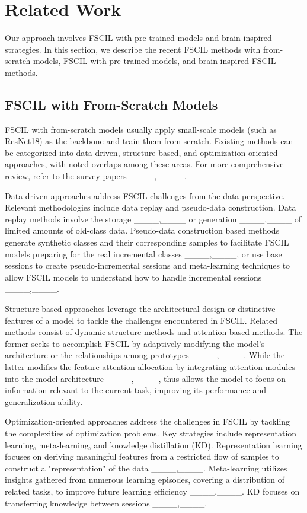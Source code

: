 \section{Related Work}
\label{sec:relatedwork}
Our approach involves FSCIL with pre-trained models and brain-inspired strategies. In this section, we describe the recent FSCIL methods with from-scratch models, FSCIL with pre-trained models, and brain-inspired FSCIL methods.
\subsection{FSCIL with From-Scratch Models}
FSCIL with from-scratch models usually apply small-scale models (such as ResNet18) as the backbone and train them from scratch. Existing methods can be categorized into data-driven, structure-based, and optimization-oriented approaches, with noted overlaps among these areas. For more comprehensive review, refer to the survey papers ____, ____. 

Data-driven approaches address FSCIL challenges from the data perspective. Relevant methodologies include data replay and pseudo-data construction. Data replay methods involve the storage ____,____ or generation ____,____ of limited amounts of old-class data. Pseudo-data construction  based methods generate synthetic classes and their corresponding samples to facilitate FSCIL models preparing for the real
incremental classes ____,____, or use base sessions to create pseudo-incremental sessions and meta-learning techniques to allow FSCIL models to understand how to handle incremental sessions ____,____.

Structure-based approaches leverage the architectural design or distinctive features of a model to tackle the challenges encountered in FSCIL. Related methods consist of dynamic structure methods and attention-based methods. The former seeks to accomplish FSCIL by adaptively modifying the model's architecture or the relationships among prototypes ____,____. While the latter modifies the feature attention allocation by integrating attention modules into the model architecture ____,____, thus allows the model to focus on information relevant to the current task, improving its performance and generalization ability.

Optimization-oriented approaches address the challenges in FSCIL by tackling the complexities of optimization problems. Key strategies include representation learning, meta-learning, and knowledge distillation (KD). Representation learning focuses on deriving meaningful features from a restricted flow of samples to construct a "representation" of the data ____,____. Meta-learning utilizes insights gathered from numerous learning episodes, covering a distribution of related tasks, to improve future learning efficiency ____,____. KD focuses on transferring knowledge between sessions ____,____. 

